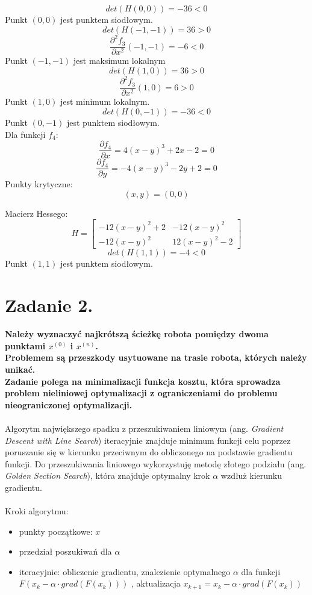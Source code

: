 \documentclass{article}
\begin{document}
$$det(H(0, 0)) = -36 < 0$$
Punkt $(0, 0)$ jest punktem siodłowym. \\

$$det(H(-1, -1)) = 36 > 0$$
$$\frac{\partial^2 f_3}{\partial x^2}(-1, -1) = -6 < 0$$
Punkt $(-1, -1)$ jest maksimum lokalnym  \\

$$det(H(1, 0)) = 36 > 0$$
$$\frac{\partial^2 f_3}{\partial x^2}(1, 0) = 6 > 0$$
Punkt $(1, 0)$ jest minimum lokalnym. \\

$$det(H(0, -1)) = -36 < 0$$
Punkt $(0, -1)$ jest punktem siodłowym. \\


Dla funkcji $f_4$:
$$\frac{\partial f_4}{\partial x} = 4(x-y)^3 + 2x - 2 = 0$$
$$\frac{\partial f_4}{\partial y} = -4(x-y)^3 -2y + 2 = 0$$
Punkty krytyczne:
$$(x, y) = (0, 0)$$

Macierz Hessego:
$$H = \begin{bmatrix}
  -12(x-y)^2 + 2 & -12(x-y)^2 \\
  -12(x-y)^2 & 12(x-y)^2-2 
\end{bmatrix}$$
$$det(H(1, 1)) = -4 < 0$$
Punkt $(1, 1)$ jest punktem siodłowym.



\section*{Zadanie 2.}
\textbf{Należy wyznaczyć najkrótszą ścieżkę robota pomiędzy dwoma punktami
$x^{(0)}$ i $x^{(n)}$. \\
Problemem są przeszkody usytuowane na trasie robota, których
należy unikać.\\
Zadanie polega na minimalizacji funkcja kosztu, która sprowadza
problem nieliniowej optymalizacji z ograniczeniami do problemu nieograniczonej
optymalizacji.}
\\\\

Algorytm największego spadku z przeszukiwaniem liniowym (ang. \textit{Gradient Descent with Line Search})
iteracyjnie znajduje minimum funkcji celu poprzez poruszanie się w kierunku przeciwnym do
obliczonego na podstawie gradientu funkcji. Do przeszukiwania liniowego wykorzystuję metodę złotego podziału
(ang. \textit{Golden Section Search}), która znajduje optymalny krok $\alpha$ wzdłuż kierunku gradientu.
\\\\
Kroki algorytmu:
\begin{itemize}
  \item punkty początkowe: $x$\\
  \item przedział poszukiwań dla $\alpha$ \\
  \item iteracyjnie: obliczenie gradientu, znalezienie optymalnego $\alpha$ dla funkcji $F(x_{k} - \alpha \cdot grad(F(x_k)))$
  , aktualizacja $x_{k+1} = x_k - \alpha \cdot grad(F(x_k))$ \\
\end{itemize}
\end{document}
